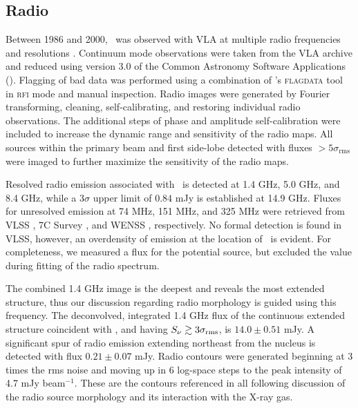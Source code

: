 \documentclass[useAMS,usenatbib]{mn2e}
\begin{document}
\subsection{Radio}
\label{sec:radio}

Between 1986 and 2000, \irs\ was observed with VLA at multiple radio
frequencies and resolutions \citep[see also][for 1.4 and 5 GHz
  analysis; hereafter H93]{1993ApJ...415...82H}. Continuum mode
observations were taken from the VLA archive and reduced using version
3.0 of the Common Astronomy Software Applications (\casa). Flagging of
bad data was performed using a combination of \casa's
{\textsc{flagdata}} tool in {\textsc{rfi}} mode and manual
inspection. Radio images were generated by Fourier transforming,
cleaning, self-calibrating, and restoring individual radio
observations. The additional steps of phase and amplitude
self-calibration were included to increase the dynamic range and
sensitivity of the radio maps. All sources within the primary beam and
first side-lobe detected with fluxes $> 5\sigma_{\mathrm{rms}}$ were
imaged to further maximize the sensitivity of the radio maps.

Resolved radio emission associated with \irs\ is detected at 1.4 GHz,
5.0 GHz, and 8.4 GHz, while a $3\sigma$ upper limit of $0.84$ mJy is
established at 14.9 GHz. Fluxes for unresolved emission at 74 MHz, 151
MHz, and 325 MHz were retrieved from VLSS \citep{vlss}, 7C Survey
\citep{1999MNRAS.306...31R}, and WENSS \citep{1997A&AS..124..259R},
respectively. No formal detection is found in VLSS, however, an
overdensity of emission at the location of \irs\ is evident. For
completeness, we measured a flux for the potential source, but
excluded the value during fitting of the radio spectrum.

The combined 1.4 GHz image is the deepest and reveals the most
extended structure, thus our discussion regarding radio morphology is
guided using this frequency. The deconvolved, integrated 1.4 GHz flux
of the continuous extended structure coincident with \irs, and having
$S_{\nu} \gtrsim 3\sigma_{\mathrm{rms}}$, is $14.0 \pm 0.51$ mJy. A
significant spur of radio emission extending northeast from the
nucleus is detected with flux $0.21 \pm 0.07$ mJy. Radio contours were
generated beginning at 3 times the rms noise and moving up in 6
log-space steps to the peak intensity of 4.7 mJy beam$^{-1}$. These
are the contours referenced in all following discussion of the radio
source morphology and its interaction with the X-ray gas.
\end{document}
